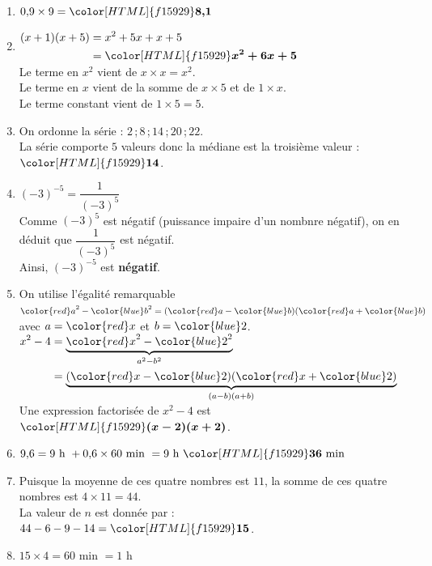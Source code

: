 \documentclass[a4paper,11pt,landscape,exos]{nsi} %
\begin{document}
\begin{multicols}{2}
\begin{enumerate}[]
    \item $0{,}9 \times 9={\color[HTML]{f15929}\boldsymbol{8{,}1}}$
\item $\begin{aligned}
      (x+1)(x+5)&=x^2+5x+x+5\\
      &={\color[HTML]{f15929}\boldsymbol{x^2+6x+5}}
      \end{aligned}$\\Le terme en $x^2$ vient de $x\times x=x^2$.\\Le terme en $x$ vient de la somme de $x \times 5$ et de $1 \times x$.\\Le terme constant vient de $1\times 5= 5$.
\item On ordonne la série :  $2$\,;\,$8$\,;\,$14$\,;\,$20$\,;\,$22$.\\
      La série comporte $5$ valeurs donc la médiane est la troisième valeur : ${\color[HTML]{f15929}\boldsymbol{14}}$.
\item $(-3)^{-5}=\dfrac{1}{(-3)^{5}}$\\
     Comme  $(-3)^{5}$ est  négatif (puissance impaire d'un nombnre négatif), on en déduit que  $\dfrac{1}{(-3)^{5}}$ est négatif.\\
    Ainsi, $(-3)^{-5}$ est {\bfseries \color[HTML]{f15929}négatif}.
\item On utilise l'égalité remarquable ${\color{red} a}^2-{\color{blue} b}^2=({\color{red} a}-{\color{blue} b})({\color{red} a}+{\color{blue} b})$ avec $a={\color{red} x}$  et $b={\color{blue} 2}$.\\$\begin{aligned}
 x^2-4&=\underbrace{{\color{red} x}^2-{\color{blue} 2}^2}_{a^2-b^2}\\
 &=\underbrace{({\color{red} x}-{\color{blue} 2})({\color{red} x}+{\color{blue} 2})}_{(a-b)(a+b)}
 \end{aligned}$ \\
    Une expression factorisée de $x^2-4$ est ${\color[HTML]{f15929}\boldsymbol{(x-2)(x+2)}}$.
\item $9{,}6 = 9 \text{ h } + 0{,}6\times 60 \text{ min } = 9 \text{ h }  {\color[HTML]{f15929}\boldsymbol{36}} \text{ min}$
\item Puisque la moyenne de ces quatre nombres est $11$, la somme de ces quatre nombres est $4\times 11=44$.\\
             La valeur de $n$ est donnée par :  $44-6-9-14={\color[HTML]{f15929}\boldsymbol{15}}$.
\item $15\times 4= 60$ min $=1$ h\\

\end{enumerate}
\end{multicols}
\end{document}
